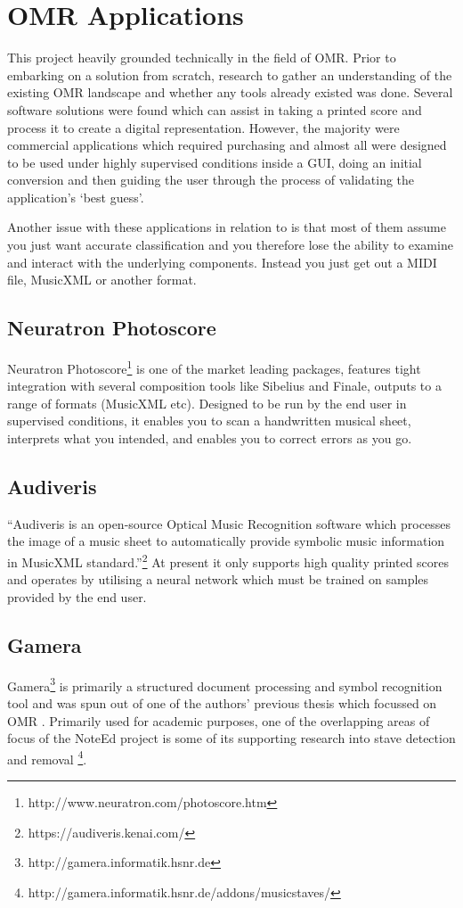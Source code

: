 \section{OMR Applications}

This project heavily grounded technically in the field of \acrfull{OMR}.  Prior to embarking on a solution from scratch, research to gather an understanding of the existing OMR landscape and whether any tools already existed was done. Several software solutions were found which can assist in taking a printed score and process it to create a digital representation. However, the majority were commercial applications which required purchasing and almost all were designed to be used under highly supervised conditions inside a \acrfull{GUI}, doing an initial conversion and then guiding the user through the process of validating the application's `best guess'.

Another issue with these applications in relation to \noteED is that most of them assume you just want accurate classification and you therefore lose the ability to examine and interact with the underlying components. Instead you just get out a MIDI file, MusicXML or another format.

\subsection{Neuratron Photoscore}
Neuratron Photoscore\footnote{http://www.neuratron.com/photoscore.htm} is one of the market leading packages, features tight integration with several composition tools like Sibelius and Finale, outputs to a range of formats (MusicXML etc). Designed to be run by the end user in supervised conditions, it enables you to scan a handwritten musical sheet, interprets what you intended, and enables you to correct errors as you go.

\subsection{Audiveris}
``Audiveris is an open-source Optical Music Recognition software which processes the image of a music sheet to automatically provide symbolic music information in MusicXML standard.''\footnote{https://audiveris.kenai.com/}
\newline
At present it only supports high quality printed scores and operates by utilising a neural network which must be trained on samples provided by the end user.

\subsection{Gamera}
Gamera\footnote{http://gamera.informatik.hsnr.de} is primarily a structured document processing and symbol recognition tool \parencite{macmillan2002gamera} and was spun out of one of the authors' previous thesis which focussed on OMR \parencite{fujinaga1996adaptive}. Primarily used for academic purposes, one of the overlapping areas of focus of the NoteEd project is some of its supporting research into stave detection and removal \footnote{http://gamera.informatik.hsnr.de/addons/musicstaves/}.

